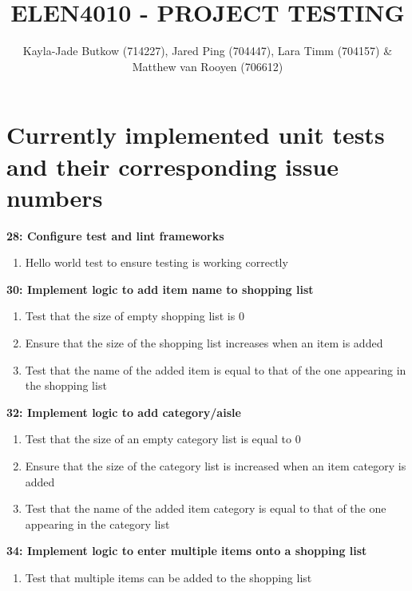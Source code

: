\documentclass[10pt,onecolumn]{witseiepaper}
\title{ELEN4010 - PROJECT TESTING}
\author{Kayla-Jade Butkow (714227), Jared Ping (704447), Lara Timm (704157) \& Matthew van Rooyen (706612)}
\begin{document}
\maketitle
\pagestyle{plain}
\setcounter{page}{1}

\section{Currently implemented unit tests and their corresponding issue numbers}

\textbf{28: Configure test and lint frameworks}

\begin{enumerate}
	\item Hello world test to ensure testing is working correctly
\end{enumerate}

\textbf{30: Implement logic to add item name to shopping list}

\begin{enumerate}
	\item Test that the size of empty shopping list is 0
	\item Ensure that the size of the shopping list increases when an item is added
	\item Test that the name of the added item is equal to that of the one appearing in the shopping list
\end{enumerate}

\textbf{32: Implement logic to add category/aisle}

\begin{enumerate}
	\item Test that the size of an empty category list is equal to 0
	\item Ensure that the size of the category list is increased when an item category is added
	\item Test that the name of the added item category is equal to that of the one appearing in the category list
\end{enumerate}

\textbf{34: Implement logic to enter multiple items onto a shopping list}

\begin{enumerate}
	\item Test that multiple items can be added to the shopping list
\end{enumerate}

\vspace{5mm}
\end{document}
